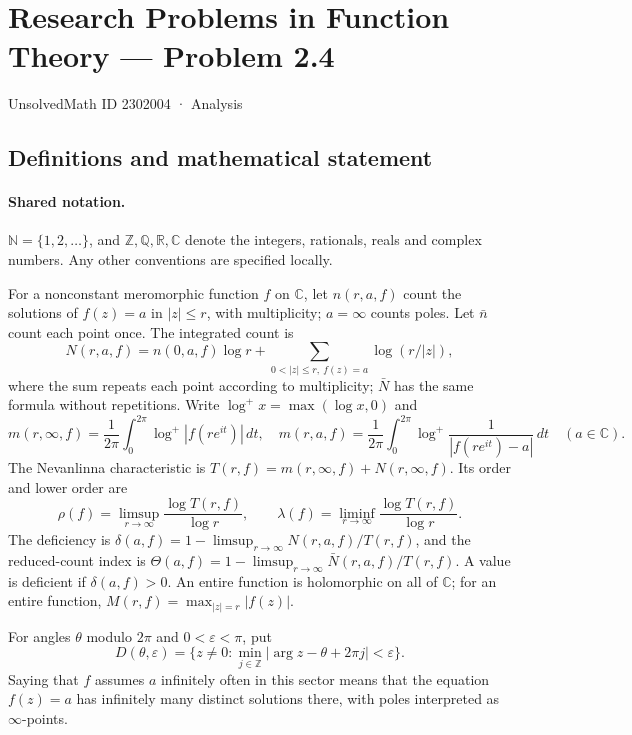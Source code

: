\documentclass[11pt]{article}
\begin{document}
\setcounter{section}{2302003}
\section{Research Problems in Function Theory — Problem 2.4}\label{2302004}
{\small\sffamily UnsolvedMath ID 2302004 · Analysis}
\subsection{Definitions and mathematical statement}

\paragraph{Shared notation.}$\mathbb N=\{1,2,\ldots\}$, and $\mathbb Z,\mathbb Q,\mathbb R,\mathbb C$ denote the integers, rationals, reals and complex numbers. Any other conventions are specified locally.


For a nonconstant meromorphic function $f$ on $\mathbb C$, let $n(r,a,f)$ count the solutions of $f(z)=a$ in $|z|\le r$, with multiplicity; $a=\infty$ counts poles. Let $\bar n$ count each point once. The integrated count is
\[
 N(r,a,f)=n(0,a,f)\log r+\sum_{0<|z|\le r,\ f(z)=a}\log(r/|z|),
\]
where the sum repeats each point according to multiplicity; $\bar N$ has the same formula without repetitions. Write $\log^+x=\max(\log x,0)$ and
\[
 m(r,\infty,f)=\frac1{2\pi}\int_0^{2\pi}\log^+|f(re^{it})|\,dt,\quad
 m(r,a,f)=\frac1{2\pi}\int_0^{2\pi}\log^+\frac1{|f(re^{it})-a|}\,dt\quad(a\in\mathbb C).
\]
The Nevanlinna characteristic is $T(r,f)=m(r,\infty,f)+N(r,\infty,f)$. Its order and lower order are
\[
 \rho(f)=\limsup_{r\to\infty}\frac{\log T(r,f)}{\log r},\qquad
 \lambda(f)=\liminf_{r\to\infty}\frac{\log T(r,f)}{\log r}.
\]
The deficiency is $\delta(a,f)=1-\limsup_{r\to\infty}N(r,a,f)/T(r,f)$, and the reduced-count index is $\Theta(a,f)=1-\limsup_{r\to\infty}\bar N(r,a,f)/T(r,f)$. A value is deficient if $\delta(a,f)>0$. An entire function is holomorphic on all of $\mathbb C$; for an entire function, $M(r,f)=\max_{|z|=r}|f(z)|$.

For angles $\theta$ modulo $2\pi$ and $0<\varepsilon<\pi$, put
\[
 D(\theta,\varepsilon)=\{z\ne0:\min_{j\in\mathbb Z}|\arg z-\theta+2\pi j|<\varepsilon\}.
\]
Saying that $f$ assumes $a$ infinitely often in this sector means that the equation $f(z)=a$ has infinitely many distinct solutions there, with poles interpreted as $\infty$-points.
\end{document}
